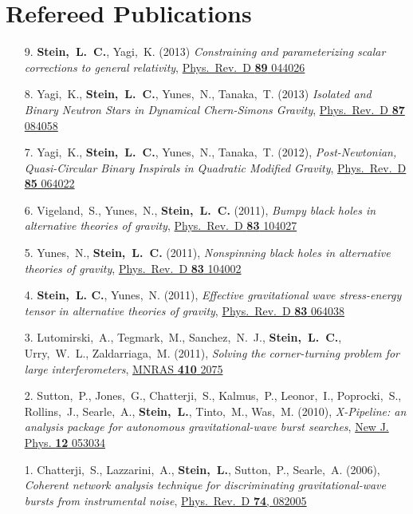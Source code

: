\section{\sc Refereed Publications}
\begin{enumerate}
\item[{9.}] {\bf Stein,~L.~C.}, Yagi,~K. (2013)
  {\it Constraining and parameterizing scalar corrections to general relativity},
  \href{http://arxiv.org/abs/1310.6743}{Phys.~Rev.~D {\bf 89} 044026}
\item[{8.}] Yagi,~K., {\bf Stein,~L.~C.}, Yunes,~N., Tanaka,~T. (2013)
  {\it Isolated and Binary Neutron Stars in Dynamical Chern-Simons
    Gravity},
  \href{http://arxiv.org/abs/1302.1918}{Phys.~Rev.~D {\bf 87} 084058}
\item[{7.}] Yagi,~K., {\bf Stein,~L.~C.}, Yunes,~N.,
  Tanaka,~T. (2012), {\it Post-Newtonian, Quasi-Circular Binary
    Inspirals in Quadratic Modified Gravity},
  \href{http://arxiv.org/abs/1110.5950}{Phys.~Rev.~D {\bf 85} 064022}
\item[{6.}] Vigeland,~S., Yunes,~N., {\bf Stein,~L.~C.} (2011), {\it
    Bumpy black holes in alternative theories of gravity},
  \href{http://arxiv.org/abs/1102.3706}{Phys.~Rev.~D {\bf 83} 104027}
\item[{5.}] Yunes,~N., {\bf Stein,~L.~C.} (2011), {\it Nonspinning
    black holes in alternative theories of gravity},
  \href{http://arxiv.org/abs/1101.2921}{Phys.~Rev.~D {\bf 83} 104002}
\item[{4.}] {\bf Stein,~L. C.}, Yunes,~N. (2011), {\it Effective
    gravitational wave stress-energy tensor in alternative theories of
    gravity},
  \href{http://arxiv.org/abs/1012.3144}{Phys.~Rev.~D {\bf 83} 064038}
\item[{3.}] Lutomirski,~A., Tegmark,~M., Sanchez,~N.~J., {\bf
    Stein,~L.~C.},
  Urry,~W.~L., Zaldarriaga,~M. (2011), {\it Solving the
    corner-turning problem for large interferometers},
  \href{http://arxiv.org/abs/0910.1351}{MNRAS {\bf 410} 2075}
\item[{2.}] Sutton,~P., Jones,~G., Chatterji,~S., Kalmus,~P., Leonor,~I.,
  Poprocki,~S., Rollins,~J., Searle,~A., {\bf Stein,~L.}, Tinto,~M.,
  Was,~M. (2010), {\it X-Pipeline: an analysis package for autonomous
    gravitational-wave burst searches},
  \href{http://arxiv.org/abs/0908.3665}{New J. Phys. {\bf 12} 053034}
\item[{1.}] Chatterji,~S., Lazzarini,~A., {\bf Stein,~L.}, Sutton,~P.,
  Searle,~A. (2006), {\it Coherent network analysis technique for
    discriminating gravitational-wave bursts from instrumental noise},
  \href{http://arxiv.org/abs/gr-qc/0605002}{Phys.~Rev.~D {\bf 74}, 082005}
\end{enumerate}

